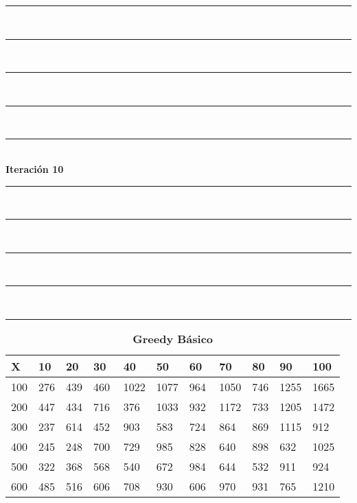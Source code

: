 \documentclass[10pt,letterpaper]{article}
\begin{document}
\newpage 
\begin{center}
\newcommand{\HRule}{\rule{\linewidth}{0.5mm}}
\center
\HRule\\[6cm]
\HRule\\[0.4cm]
\HRule\\[0.4cm]
\HRule\\[0.4cm]
\HRule\\[0.4cm]
{\centering \Huge\bfseries Iteración 10}\\[0.4cm]
\HRule\\[0.4cm]
\HRule\\[0.4cm]
\HRule\\[0.4cm]
\HRule\\[6cm]
\HRule
\end{center}
\newpage 
{}
\begin{center}
\begin{table}\renewcommand{\arraystretch}{2.5}
\caption{\large \textbf{Greedy Básico}}
\centering
\begin{tabular} { |m{0.5cm}|m{1.3cm}|m{1.3cm}|m{1.3cm}|m{1.3cm}|m{1.3cm}|m{1.3cm}|m{1.3cm}|m{1.3cm}|m{1.3cm}|m{1.3cm}|} 
\hline
\rowcolor{Gray}
\centering \textbf{X} & \centering \textbf{10} & \centering \textbf{20} & \centering \textbf{30}\ & \centering \textbf{40} & \centering \textbf{50} & \centering \textbf{60}\ & \centering \textbf{70} & \centering \textbf{80} & \centering \textbf{90}\ & \textbf{100} \\\hline
\cellcolor{Gray}100 & \Large 276 & \Large 439 & \Large 460 & \Large 1022 & \Large 1077 & \Large 964 & \Large 1050 & \Large 746 & \Large 1255 & \Large 1665 \\
\hline
\cellcolor{Gray}200 & \Large 447 & \Large 434 & \Large 716 & \Large 376 & \Large 1033 & \Large 932 & \Large 1172 & \Large 733 & \Large 1205 & \Large 1472 \\
\hline
\cellcolor{Gray}300 & \Large 237 & \Large 614 & \Large 452 & \Large 903 & \Large 583 & \Large 724 & \Large 864 & \Large 869 & \Large 1115 & \Large 912 \\
\hline
\cellcolor{Gray}400 & \Large 245 & \Large 248 & \Large 700 & \Large 729 & \Large 985 & \Large 828 & \Large 640 & \Large 898 & \Large 632 & \Large 1025 \\
\hline
\cellcolor{Gray}500 & \Large 322 & \Large 368 & \Large 568 & \Large 540 & \Large 672 & \Large 984 & \Large 644 & \Large 532 & \Large 911 & \Large 924 \\
\hline
\cellcolor{Gray}600 & \Large 485 & \Large 516 & \Large 606 & \Large 708 & \Large 930 & \Large 606 & \Large 970 & \Large 931 & \Large 765 & \Large 1210 \\

\end{tabular}
\end{table}
\end{center}
\end{document}
